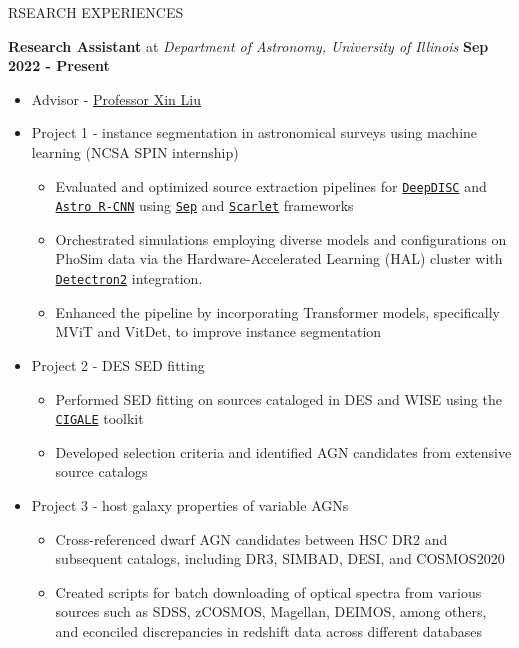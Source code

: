 \documentclass[10pt]{article} %
\begin{document}
\begin{section}{RSEARCH EXPERIENCES}

\textbf{Research Assistant} at \textit{Department of Astronomy, University of Illinois} \hfill \textbf{Sep 2022 - Present} 
\begin{itemize}[leftmargin=1.5em]
    \item Advisor - \href{mailto:xinliuxl@illinois.edu}{Professor Xin Liu}
    \item Project 1 - instance segmentation in astronomical surveys using machine learning (NCSA SPIN internship) %
    \begin{itemize}[leftmargin=1.5em]
        \item Evaluated and optimized source extraction pipelines for \href{https://github.com/burke86/deepdisc}{\texttt{DeepDISC}} and \href{https://github.com/burke86/astro_rcnn}{\texttt{Astro R-CNN}} using \href{https://github.com/kbarbary/sep/tree/v1.1.x}{\texttt{Sep}} and \href{https://github.com/pmelchior/scarlet}{\texttt{Scarlet}} frameworks
        \item Orchestrated simulations employing diverse models and configurations on PhoSim data via the Hardware-Accelerated Learning (HAL) cluster with \href{https://github.com/facebookresearch/detectron2}{\texttt{Detectron2}} integration.
        \item Enhanced the pipeline by incorporating Transformer models, specifically MViT and VitDet, to improve instance segmentation
    \end{itemize}
    \item Project 2 - DES SED fitting %
    \begin{itemize}[leftmargin=1.5em]
        \item Performed SED fitting on sources cataloged in DES and WISE using the \href{https://cigale.lam.fr/}{\texttt{CIGALE}} toolkit
        \item Developed selection criteria and identified AGN candidates from extensive source catalogs
    \end{itemize}
    \item Project 3 - host galaxy properties of variable AGNs %
    \begin{itemize}[leftmargin=1.5em]
        \item Cross-referenced dwarf AGN candidates between HSC DR2 and subsequent catalogs, including DR3, SIMBAD, DESI, and COSMOS2020
        \item Created scripts for batch downloading of optical spectra from various sources such as SDSS, zCOSMOS, Magellan, DEIMOS, among others, and econciled discrepancies in redshift data across different databases

\end{itemize}
\end{itemize}
\end{section}
\end{document}
